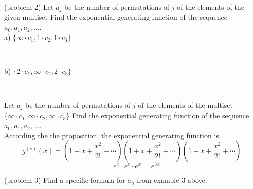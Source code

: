 \documentclass[handout]{ximera}
\begin{document}
\begin{problem}(problem 2)
Let $a_j$ be the number of permutations of $j$ of the elements of the given multiset 
Find the exponential generating function of the sequence $a_0, a_1, a_2, ...$.\\
a) $\{\infty  \cdot c_1, 1 \cdot c_2, 1\cdot c_3\}$ 
\begin{multipleChoice}
\\
\end{multipleChoice}



b) $\{2 \cdot c_1, \infty \cdot c_2, 2 \cdot c_3\}$ 
\begin{multipleChoice}
\\
\end{multipleChoice}

\end{problem}




\begin{example}[example 3]
Let $a_j$ be the number of permutations of $j$ of the elements of the multiset $\{\infty \cdot c_1, \infty \cdot c_2, \infty \cdot c_3\}$
Find the exponential generating function of the sequence $a_0, a_1, a_2, ...$.\\
According the the proposition, the exponential generating function is
\[
g^{(e)}(x) = \left(1 + x + \frac{x^2}{2!} + \cdots \right)\left(1 + x + \frac{x^2}{2!} + \cdots \right)
\left(1 + x + \frac{x^2}{2!} + \cdots \right)
\]
\[
= e^x \cdot e^x \cdot e^x = e^{3x}
\]
\end{example}

\begin{problem}(problem 3)
Find a specific formula for $a_n$ from example 3 above.\\
\begin{multipleChoice}
\\
\\
\end{multipleChoice}
\end{problem}
\end{document}
